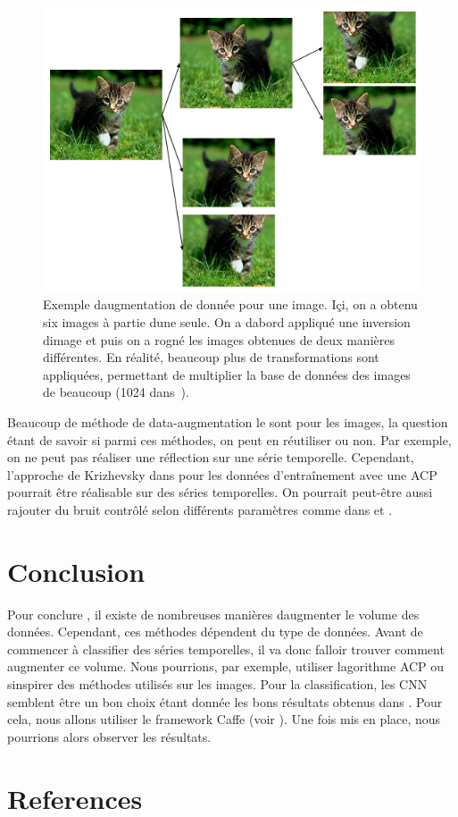 \documentclass[11pt]{sdm}
\begin{document}
		\begin{figure}[!ht]
			\centering
			\includegraphics[scale=0.6,natwidth=528,natheight=397]{figure4.png}
			\caption{Exemple d\textquotesingle augmentation de donn\'ee pour une image. I\c ci, on a obtenu six images \`a partie d\textquotesingle une seule. On a d\textquotesingle abord appliqu\'e une inversion d\textquotesingle image et puis on a rogn\'e les images obtenues de deux mani\`eres diff\'erentes. En r\'ealit\'e, beaucoup plus de transformations sont appliqu\'ees, permettant de multiplier la base de donn\'ees des images de beaucoup (1024 dans~\cite{howard2013some}).}
			\label{fig:dataAugmentationChat}
		\end{figure}

		Beaucoup de m\'ethode de data-augmentation le sont pour les images, la question \'etant de savoir si parmi ces m\'ethodes, on peut en r\'eutiliser ou non. Par exemple, on ne peut pas r\'ealiser une r\'eflection sur une s\'erie temporelle. Cependant, l’approche de Krizhevsky dans \cite{krizhevsky2012imagenet} pour les donn\'ees d’entra\^inement avec une ACP pourrait \^etre r\'ealisable sur des s\'eries temporelles. On pourrait peut-\^etre aussi rajouter du bruit contrôl\'e selon diff\'erents param\`etres comme dans \cite{krizhevsky2012imagenet} et \cite{howard2013some}.


\bigbreak
\bigbreak
\section{Conclusion}
Pour conclure , il existe de nombreuses mani\`eres d\textquotesingle augmenter le volume des donn\'ees. Cependant, ces m\'ethodes d\'ependent du type de donn\'ees. Avant de commencer \`a classifier des s\'eries temporelles, il va donc falloir trouver comment augmenter ce volume. Nous pourrions, par exemple, utiliser l\textquotesingle agorithme ACP ou s\textquotesingle inspirer des m\'ethodes utilis\'es sur les images.
Pour la classification, les CNN semblent \^etre un bon choix \'etant donn\'ee les bons r\'esultats obtenus dans \cite{zheng2014time}. Pour cela, nous allons utiliser le framework Caffe (voir \cite{jia2014caffe}). Une fois mis en place, nous pourrions alors observer les r\'esultats.

\section*{References}
	\nocite{*}
	
	
\end{document}
